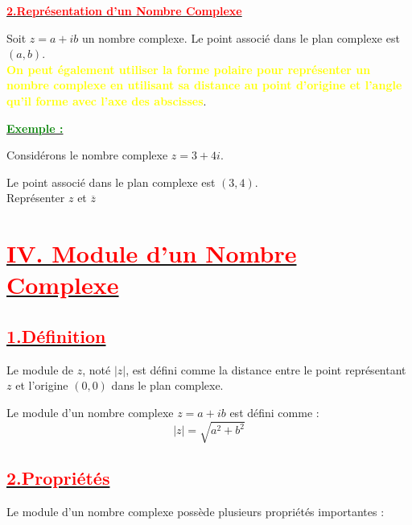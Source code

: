 \documentclass[12pt,a4paper]{article}
\newcounter{exemple} %
\newcommand{\exemple}{%
  \refstepcounter{exemple}%
  \textbf{\textcolor{green}{Exemple \theexemple :}} \ignorespaces
}
\begin{document}
\underline{\textbf{\textcolor{red}{2.Représentation d'un Nombre Complexe}}}

Soit $z = a + ib$ un nombre complexe. Le point associé dans le plan complexe est $(a, b)$.\\
\textbf{\textcolor{yellow}{On peut également utiliser la forme polaire pour représenter un nombre complexe en utilisant sa distance au point d'origine et l'angle qu'il forme avec l'axe des abscisses}}.

\underline{\exemple}

Considérons le nombre complexe $z = 3 + 4i$. 

Le point associé dans le plan complexe est $(3, 4)$.\\
Représenter $z$ et $\overline{z}$\\


\section*{\underline{\textbf{\textcolor{red}{IV. Module d'un Nombre Complexe}}}}
\subsection*{\underline{\textbf{\textcolor{red}{1.Définition  }}}} 
Le module de $z$, noté $|z|$, est défini comme la distance entre le point représentant $z$ et l'origine $(0,0)$ dans le plan complexe.

Le module d'un nombre complexe $z = a + ib$ est défini comme :
\[ |z| = \sqrt{a^2 + b^2} \]

\subsection*{\underline{\textbf{\textcolor{red}{2.Propriétés}}}}

Le module d'un nombre complexe possède plusieurs propriétés importantes :
\end{document}
